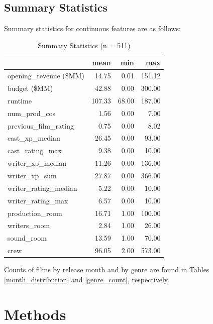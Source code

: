 \documentclass[10pt]{article}
\begin{document}
\subsection{Summary Statistics}
Summary statistics for continuous features are as follows:
\begin{table}[H]
\centering
\caption{Summary Statistics (n = 511)\label{summary_stats}}
\begin{tabular}{lrrr}
\toprule
 & mean & min & max \\
\midrule
opening\_revenue (\$MM) & 14.75 & 0.01 & 151.12 \\
budget (\$MM) & 42.88 & 0.00 & 300.00 \\
runtime & 107.33 & 68.00 & 187.00 \\
num\_prod\_cos & 1.56 & 0.00 & 7.00 \\
previous\_film\_rating & 0.75 & 0.00 & 8.02 \\
cast\_xp\_median & 26.45 & 0.00 & 93.00 \\
cast\_rating\_max & 9.38 & 0.00 & 10.00 \\
writer\_xp\_median & 11.26 & 0.00 & 136.00 \\
writer\_xp\_sum & 27.87 & 0.00 & 366.00 \\
writer\_rating\_median & 5.22 & 0.00 & 10.00 \\
writer\_rating\_max & 6.57 & 0.00 & 10.00 \\
production\_room & 16.71 & 1.00 & 100.00 \\
writers\_room & 2.84 & 1.00 & 26.00 \\
sound\_room & 13.59 & 1.00 & 70.00 \\
crew & 96.05 & 2.00 & 573.00 \\
\bottomrule
\end{tabular}
\end{table}

Counts of films by release month and by genre are found in Tables \ref{month_distribution} and \ref{genre_count}, respectively.

\section{Methods}
\end{document}
